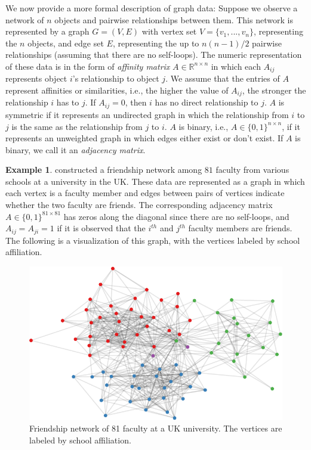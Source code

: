 \documentclass[
  11pt,
]{article}
\theoremstyle{definition}
\theoremstyle{definition}
\newtheorem{example}{Example}[section]
\theoremstyle{definition}
\theoremstyle{definition}
\theoremstyle{remark}
\begin{document}
We now provide a more formal description of graph data:
Suppose we observe a network of \(n\) objects and pairwise relationships between them.
This network is represented by a graph \(G = (V, E)\) with vertex set \(V = \{v_1, ..., v_n\}\), representing the \(n\) objects, and edge set \(E\), representing the up to \(n (n - 1) / 2\) pairwise relationships (assuming that there are no self-loops).
The numeric representation of these data is in the form of \emph{affinity matrix} \(A \in \mathbb{R}^{n \times n}\) in which each \(A_{ij}\) represents object \(i\)'s relationship to object \(j\).
We assume that the entries of \(A\) represent affinities or similarities, i.e., the higher the value of \(A_{ij}\), the stronger the relationship \(i\) has to \(j\).
If \(A_{ij} = 0\), then \(i\) has no direct relationship to \(j\).
\(A\) is symmetric if it represents an undirected graph in which the relationship from \(i\) to \(j\) is the same as the relationship from \(j\) to \(i\).
\(A\) is binary, i.e., \(A \in \{0, 1\}^{n \times n}\), if it represents an unweighted graph in which edges either exist or don't exist.
If \(A\) is binary, we call it an \emph{adjacency matrix}.

\begin{example}
\label{ex:uk-faculty}
\citet{PhysRevE.77.016107} constructed a friendship network among $81$ faculty from various schools at a university in the UK. 
These data are represented as a graph in which each vertex is a faculty member and edges between pairs of vertices indicate whether the two faculty are friends. 
The corresponding adjacency matrix $A \in \{0, 1\}^{81 \times 81}$ has zeros along the diagonal since there are no self-loops, and $A_{ij} = A_{ji} = 1$ if it is observed that the $i^{th}$ and $j^{th}$ faculty members are friends. 
The following is a visualization of this graph, with the vertices labeled by school affiliation. 

\begin{figure}[H]

{\centering \includegraphics{draft_files/figure-latex/friendship-network-1} 

}

\caption{Friendship network of 81 faculty at a UK university. The vertices are labeled by school affiliation.}\label{fig:friendship-network}
\end{figure}
\end{example}
\end{document}
